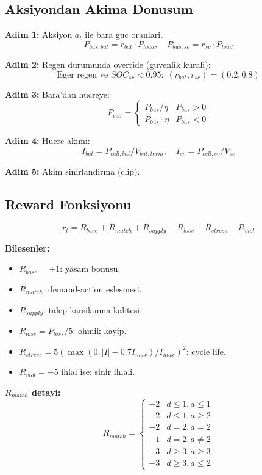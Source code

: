 \documentclass[11pt,a4paper]{article}
\begin{document}
\subsection{Aksiyondan Akima Donusum}

\textbf{Adim 1:} Aksiyon $a_t$ ile bara guc oranlari.
\[
P_{bus,bat} = r_{bat} \cdot P_{load}, \quad P_{bus,sc} = r_{sc} \cdot P_{load}
\]

\textbf{Adim 2:} Regen durumunda override (guvenlik kurali):
\[
\text{Eger regen ve } SOC_{sc} < 0.95:\;(r_{bat}, r_{sc}) = (0.2, 0.8)
\]

\textbf{Adim 3:} Bara'dan hucreye:
\[
P_{cell} = \begin{cases} P_{bus}/\eta & P_{bus}>0 \\ P_{bus}\cdot\eta & P_{bus}<0 \end{cases}
\]

\textbf{Adim 4:} Hucre akimi:
\[
I_{bat} = P_{cell,bat}/V_{bat,term}, \quad I_{sc} = P_{cell,sc}/V_{sc}
\]

\textbf{Adim 5:} Akim sinirlandirma (clip).

\subsection{Reward Fonksiyonu}

\[
\boxed{\;r_t = R_{base} + R_{match} + R_{supply} - R_{loss} - R_{stress} - R_{viol}\;}
\]

\textbf{Bilesenler:}
\begin{itemize}
  \item $R_{base} = +1$: yasam bonusu.
  \item $R_{match}$: demand-action eslesmesi.
  \item $R_{supply}$: talep karsilanma kalitesi.
  \item $R_{loss} = P_{loss}/5$: ohmik kayip.
  \item $R_{stress} = 5 (\max(0, |I| - 0.7 I_{max})/I_{max})^2$: cycle life.
  \item $R_{viol} = +5$ ihlal ise: sinir ihlali.
\end{itemize}

\textbf{$R_{match}$ detayi:}
\[
R_{match} = \begin{cases}
+2 & d \leq 1, a \leq 1 \\
-2 & d \leq 1, a \geq 2 \\
+2 & d = 2, a = 2 \\
-1 & d = 2, a \neq 2 \\
+3 & d \geq 3, a \geq 3 \\
-3 & d \geq 3, a \leq 2
\end{cases}
\]
\end{document}
